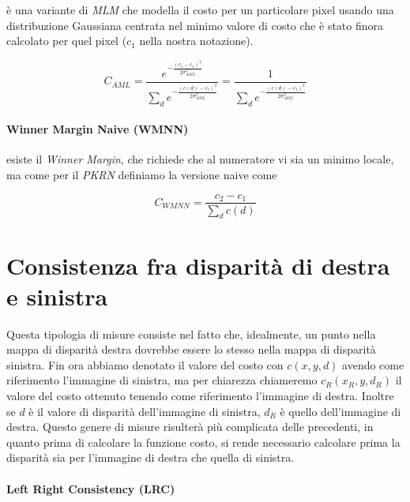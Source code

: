 \documentclass[12pt]{report}
\begin{document}
				è una variante di \textit{MLM} che modella il costo per un particolare pixel usando una distribuzione Gaussiana centrata nel minimo valore di costo che è stato finora calcolato per quel pixel ($c_{1}$ nella nostra notazione).
				
				\begin{equation}
					C_{AML}=\frac{e^{-\frac{(c_{1}-c_{1})^2}{2\sigma_{AML}^2}}}{\sum_{d} e^{-\frac{(c(d)-c_{1})^2}{2\sigma_{AML}^2}}}=\frac{1}{\sum_{d} e^{-\frac{(c(d)-c_{1})^2}{2\sigma_{AML}^2}}}
					\label{eq:AML}
				\end{equation} 
				
				
			\paragraph{Winner Margin Naive (WMNN)}
			
				esiste il \textit{Winner Margin}, che richiede che al numeratore vi sia un minimo locale, ma come per il \textit{PKRN} definiamo la versione naive come
				
				\begin{equation}
					C_{WMNN}=\frac{c_{2}-c_{1}}{\sum_{d}c(d)}
					\label{eq:WMNN} 
				\end{equation}
					
				
				
		\section{Consistenza fra disparità di destra e sinistra}
		\label{sec:leftRight}
			
			Questa tipologia di misure consiste nel fatto che, idealmente, un punto nella mappa di disparità destra dovrebbe essere lo stesso nella mappa di disparità sinistra. Fin ora abbiamo denotato il valore del costo con $c(x,y,d)$ avendo come riferimento l'immagine di sinistra, ma per chiarezza chiameremo $c_{R}(x_{R},y,d_{R})$ il valore del costo ottenuto tenendo come riferimento l'immagine di destra. Inoltre se $d$ è il valore di disparità dell'immagine di sinistra, $d_{R}$ è quello dell'immagine di destra. Questo genere di misure risulterà più complicata delle precedenti, in quanto prima di calcolare la funzione costo, si rende necessario calcolare prima la disparità sia per l'immagine di destra che quella di sinistra. 		
		
			\paragraph{Left Right Consistency (LRC)}
			\label{par:LRC}
			
\end{document}
